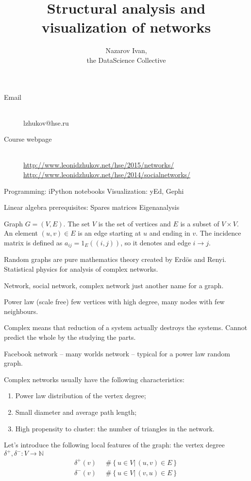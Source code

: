 \documentclass[a4paper]{article}
\title{Structural analysis and visualization of networks}
\author{Nazarov Ivan, \rus{101мНОД(ИССА)}\\the DataScience Collective}
\newcommand{\obj}[1]{{\left\{ #1 \right \}}}
\newcommand{\brac}[1]{{\left ( #1 \right )}}
\newcommand{\induc}[1]{{\left . #1 \right \vert}}
\newcommand{\Ntrl}{\mathbb{N}}
\newcommand{\defn}{\mathop{\overset{\Delta}{=}}\nolimits}
\begin{document}

\maketitle

\begin{description}
	\item[Email] \hfill \\
	lzhukov@hse.ru
	\item[Course webpage] \hfill \\
	\url{http://www.leonidzhukov.net/hse/2015/networks/}
	\url{http://www.leonidzhukov.net/hse/2014/socialnetworks/}
\end{description}

Programming: iPython notebooks
Visualization: yEd, Gephi

Linear algebra prerequisites:
	Spares matrices
	Eigenanalysis


Graph $G=(V,E)$. The set $V$ is the set of vertices and $E$ is a subset of $V\times V$.
An element $(u,v)\in E$ is an edge starting at $u$ and ending in $v$.
The incidence matrix is defined as $a_{ij}=1_E\brac{(i,j)}$, so it denotes and edge $i\to j$.

Random graphs are pure mathematics theory created by Erd\"os and Renyi.
Statistical physics for analysis of complex networks.

Network, social network, complex network just another name for a graph.

Power law (scale free) few vertices with high degree, many nodes with few neighbours.

Complex means that reduction of a system actually destroys the systems.
Cannot predict the whole by the studying the parts.

Facebook network -- many worlds network -- typical for a power law random graph.

Complex networks usually have the following characteristics: \begin{enumerate}
	\item Power law distribution of the vertex degree;
	\item Small diameter and average path length;
	\item High propensity to cluster: the number of triangles in the network.
\end{enumerate}

Let's introduce the following local features of the graph: the vertex degree $\delta^+,\delta^-:V\to \Ntrl$
\begin{align*}
	\delta^+(v) &\defn \#\obj{\induc{u\in V}\, (u,v)\in E }\\
	\delta^-(v) &\defn \#\obj{\induc{u\in V}\, (v,u)\in E }
\end{align*}
\end{document}

